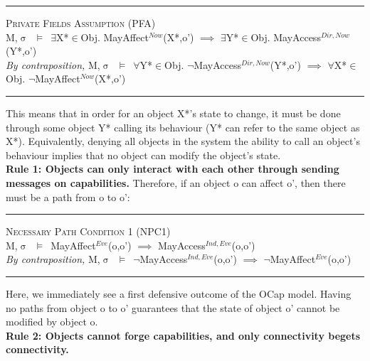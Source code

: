 \documentclass[a4paper,11pt, twoside,twocolumn]{article}
\newenvironment{logic}[1][null]
{\begin{flushleft} \small \label{#1}}
{\end{flushleft}}
\newcommand{\loin}{$\in$}
\newcommand{\loforall}{$\forall$}
\newcommand{\loexists}{$\exists$}
\newcommand{\loimplies}{$\implies$}
\newcommand{\losigma}{$\upsigma$}
\newcommand{\loturns} {$\vDash$}
\newcommand{\loneg}{$\neg$}
\newcommand{\ablock} {\null\qquad}
\begin{document}
\begin{logic}
\hrule\null
\textsc{\normalsize *Private Fields Assumption (PFA)}\\
M,\losigma\ \loturns\ \loexists X*\loin Obj. MayAffect$^{Now}$(X*,o') \loimplies \linebreak
	\ablock \ablock \loexists Y*\loin Obj. MayAccess$^{Dir,Now}$(Y*,o')
\linebreak \\
\textit{By contraposition,}\linebreak
M,\losigma\ \loturns\ 	\loforall Y*\loin Obj. \loneg MayAccess$^{Dir,Now}$(Y*,o') \loimplies \linebreak
	\ablock \ablock \loforall X*\loin Obj. \loneg MayAffect$^{Now}$(X*,o')
\linebreak
\hrule
\end{logic}

This means that in order for an object X*'s state to change, it must be done through some object Y* calling its behaviour (Y* can refer to the same object as X*). Equivalently, denying all objects in the system the ability to call an object's behaviour implies that no object can modify the object's state.\\


\textbf{Rule 1: Objects can only interact with each other through sending messages on capabilities.}
Therefore, if an object o can affect o', then there must be a path from o to o':
\begin{logic}[Implication 1]
\hrule\null
\textsc{\normalsize *Necessary Path Condition 1 (NPC1)}\\
M,\losigma\ \loturns\ MayAffect$^{Eve}$(o,o') \loimplies\linebreak
	\ablock MayAccess$^{Ind,Eve}$(o,o')
\linebreak \\
\textit{By contraposition,}\linebreak
M,\losigma\ \loturns\ \loneg MayAccess$^{Ind,Eve}$(o,o') \loimplies\linebreak
	\ablock \loneg MayAffect$^{Eve}$(o,o')
\linebreak
\hrule
\end{logic}
Here, we immediately see a first defensive outcome of the OCap model. Having no paths from object o to o' guarantees that the state of object o' cannot be modified by object o.\\

\textbf{Rule 2: Objects cannot forge capabilities, and only connectivity begets connectivity.}
\end{document}
